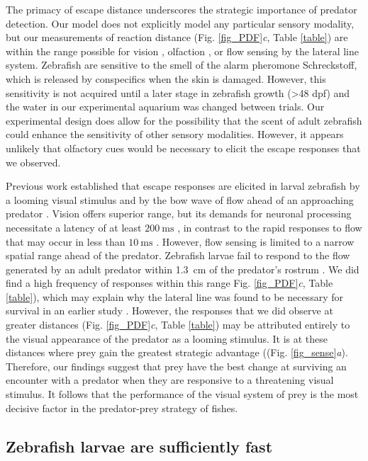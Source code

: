 \documentclass[]{rsos}%
\begin{document}
The primacy of escape distance underscores the strategic importance of predator detection. 
Our model does not explicitly model any particular sensory modality, but our measurements of reaction distance (Fig. \ref{fig_PDF}\textit{c}, Table \ref{table}) are within the range possible for vision \cite{Dunn:2016jt}, olfaction \cite{Waldman:1982ic}, or flow sensing by the lateral line system.
Zebrafish are sensitive to the smell of the alarm pheromone Schreckstoff, which is released by conspecifics when the skin is damaged. 
However, this sensitivity is not acquired until a later stage in zebrafish growth (>48 dpf) \cite{Waldman:1982ic} and the water in our experimental aquarium was changed between trials.
Our experimental design does allow for the possibility that the scent of adult zebrafish could enhance the sensitivity of other sensory modalities.
However, it appears unlikely that olfactory cues would be necessary to elicit the escape responses that we observed. 

Previous work established that escape responses are elicited in larval zebrafish by a looming visual stimulus \cite{Bianco:2011ca} and by the bow wave of flow ahead of an approaching predator \cite{Stewart:2014cma}.
Vision offers superior range, but its demands for neuronal processing necessitate a latency of at least $\SI{200}{\ms}$ \cite{Burgess:2007vp}, in contrast to the rapid responses to flow that may occur in less than $\SI{10}{\ms}$  \cite{Liu:1999fs}.
However, flow sensing is limited to a narrow spatial range ahead of the predator. 
Zebrafish larvae fail to respond to the flow generated by an adult predator within \SI{1.3}{\cm} of the predator's rostrum \cite{Stewart:2014cma}.
We did find a high frequency of responses within this range Fig. \ref{fig_PDF}\textit{c}, Table \ref{table}), which may explain why the lateral line was found to be necessary for survival in an earlier study \cite{Stewart:2013bha}.
However, the responses that we did observe at greater distances (Fig. \ref{fig_PDF}\textit{c}, Table \ref{table}) may be attributed entirely to the visual appearance of the predator as a looming stimulus. 
It is at these distances where prey gain the greatest strategic advantage ((Fig. \ref{fig_sense}\textit{a}).
Therefore, our findings suggest that prey have the best change at surviving an encounter with a predator when they are responsive to a threatening visual stimulus.
It follows that the performance of the visual system of prey is the most decisive factor in the predator-prey strategy of fishes.


\subsection{Zebrafish larvae are sufficiently fast} 
\end{document}
